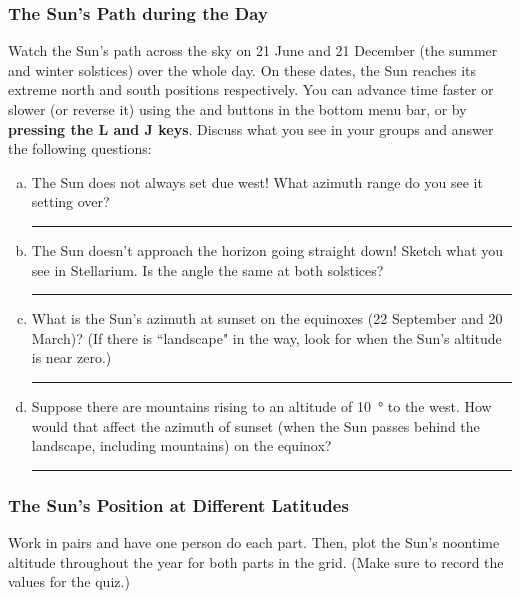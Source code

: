 \documentclass[main.tex]{subfiles}
\begin{document}
\subsubsection{The Sun's Path during the Day}
Watch the Sun's path across the sky on 21 June and 21 December (the summer and winter solstices) over the whole day. On these dates, the Sun reaches its extreme north and south positions respectively. You can advance time faster or slower (or reverse it) using the and buttons in the bottom menu bar, or by \textbf{pressing the L and J keys}. Discuss what you see in your groups and answer the following questions:
\begin{enumerate}[a.]
\item The Sun does not always set due west! What azimuth range do you see it setting over?\\

\rule{15cm}{.2mm}

\item The Sun doesn't approach the horizon going straight down! Sketch what you see in Stellarium. Is the angle the same at both solstices?\\

\rule{15cm}{.2mm}

\item What is the Sun's azimuth at sunset on the equinoxes (22 September and 20 March)? (If there is ``landscape" in the way, look for when the Sun's altitude is near zero.)\\

\rule{15cm}{.2mm}

\item Suppose there are mountains rising to an altitude of \SI{10}{\degree} to the west. How would that affect the azimuth of sunset (when the Sun passes behind the landscape, including mountains) on the equinox?\\

\rule{15cm}{.2mm}

\end{enumerate}

\subsubsection{The Sun's Position at Different Latitudes}
Work in pairs and have one person do each part. Then, plot the Sun's noontime altitude throughout the year for both parts in the grid. (Make sure to record the values for the quiz.)
\end{document}
